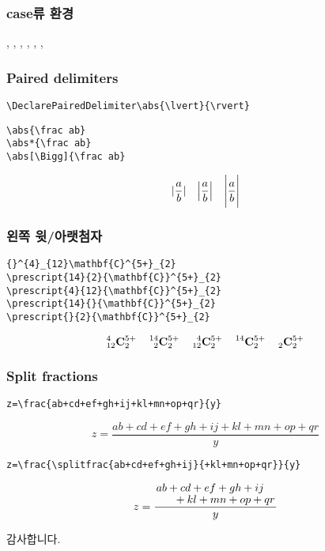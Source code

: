 \documentclass{beamer}
\begin{document}
\begin{frame}[fragile]
\frametitle{case류 환경}
\Large
\texttt{\string\dcases}, 
\alert{\texttt{\string\dcases*}}, 
\texttt{\string\rcases}, 
\texttt{\string\rcases*}, 
\texttt{\string\drcases}, 
\texttt{\string\drcases*}, 
\texttt{\string\cases*}
\end{frame}

\DeclarePairedDelimiter\abs{\lvert}{\rvert}
\begin{frame}[fragile,t]
\frametitle{Paired delimiters}
\begin{verbatim}
\DeclarePairedDelimiter\abs{\lvert}{\rvert}
\end{verbatim}
\begin{verbatim}
\abs{\frac ab}
\abs*{\frac ab}
\abs[\Bigg]{\frac ab}
\end{verbatim}
\[
\abs{\frac ab} \quad
\abs*{\frac ab} \quad
\abs[\Bigg]{\frac ab}
\]
\end{frame}

\begin{frame}[fragile,t]
\frametitle{왼쪽 윗/아랫첨자}
\begin{verbatim}
{}^{4}_{12}\mathbf{C}^{5+}_{2}          
\prescript{14}{2}{\mathbf{C}}^{5+}_{2} 
\prescript{4}{12}{\mathbf{C}}^{5+}_{2} 
\prescript{14}{}{\mathbf{C}}^{5+}_{2}   
\prescript{}{2}{\mathbf{C}}^{5+}_{2}
\end{verbatim}
{\Large
\[
      {}^{4}_{12}\mathbf{C}^{5+}_{2}          \quad
      \prescript{14}{2}{\mathbf{C}}^{5+}_{2}  \quad
      \prescript{4}{12}{\mathbf{C}}^{5+}_{2}  \quad
      \prescript{14}{}{\mathbf{C}}^{5+}_{2}   \quad
      \prescript{}{2}{\mathbf{C}}^{5+}_{2}
\]}
\end{frame}

\begin{frame}[fragile,t]
\frametitle{Split fractions}
\begin{verbatim}
z=\frac{ab+cd+ef+gh+ij+kl+mn+op+qr}{y}
\end{verbatim}

\[ 
z=\frac{ab+cd+ef+gh+ij+kl+mn+op+qr}{y} 
\]

\begin{verbatim}
z=\frac{\splitfrac{ab+cd+ef+gh+ij}{+kl+mn+op+qr}}{y}
\end{verbatim}

\[
z=\frac{\splitfrac{ab+cd+ef+gh+ij}{+kl+mn+op+qr}}{y}
\]
\end{frame}

\begin{frame}
\huge
\centering 감사합니다.
\end{frame}
\end{document}
